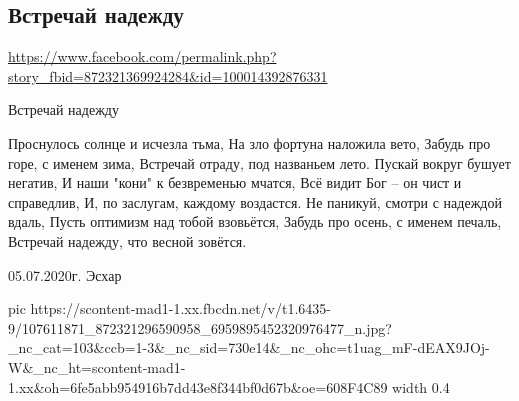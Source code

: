  
 
 
 
 

\subsection{Встречай надежду}
\url{https://www.facebook.com/permalink.php?story_fbid=872321369924284&id=100014392876331}

Встречай надежду

Проснулось солнце и исчезла тьма,
На зло фортуна наложила вето,
Забудь про горе, с именем зима,
Встречай отраду, под названьем лето.
Пускай вокруг бушует негатив,
И наши "кони" к безвременью мчатся,
Всё видит Бог – он чист и справедлив,
И, по заслугам, каждому воздастся.
Не паникуй, смотри с надеждой вдаль,
Пусть оптимизм над тобой взовьётся,
Забудь про осень, с именем печаль,
Встречай надежду, что весной зовётся.

05.07.2020г. Эсхар

\ifcmt
  pic https://scontent-mad1-1.xx.fbcdn.net/v/t1.6435-9/107611871_872321296590958_6959895452320976477_n.jpg?_nc_cat=103&ccb=1-3&_nc_sid=730e14&_nc_ohc=t1uag_mF-dEAX9JOj-W&_nc_ht=scontent-mad1-1.xx&oh=6fe5abb954916b7dd43e8f344bf0d67b&oe=608F4C89
  width 0.4
\fi

